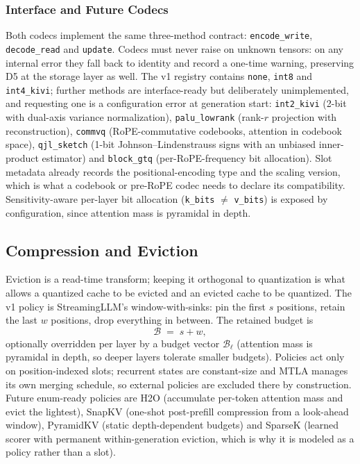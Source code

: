\subsubsection{Interface and Future Codecs}

Both codecs implement the same three-method contract: \texttt{encode\_write}, \texttt{decode\_read} and \texttt{update}. Codecs must never raise on unknown tensors: on any internal error they fall back to identity and record a one-time warning, preserving D5 at the storage layer as well. The v1 registry contains \texttt{none}, \texttt{int8} and \texttt{int4\_kivi}; further methods are interface-ready but deliberately unimplemented, and requesting one is a configuration error at generation start: \texttt{int2\_kivi} (2-bit with dual-axis variance normalization), \texttt{palu\_lowrank} (rank-$r$ projection with reconstruction), \texttt{commvq} (RoPE-commutative codebooks, attention in codebook space), \texttt{qjl\_sketch} (1-bit Johnson--Lindenstrauss signs with an unbiased inner-product estimator) and \texttt{block\_gtq} (per-RoPE-frequency bit allocation). Slot metadata already records the positional-encoding type and the scaling version, which is what a codebook or pre-RoPE codec needs to declare its compatibility. Sensitivity-aware per-layer bit allocation (\texttt{k\_bits} $\ne$ \texttt{v\_bits}) is exposed by configuration, since attention mass is pyramidal in depth.

\subsection{Compression and Eviction}
\label{sec:kv-evict}

Eviction is a read-time transform; keeping it orthogonal to quantization is what allows a quantized cache to be evicted and an evicted cache to be quantized. The v1 policy is StreamingLLM's window-with-sinks: pin the first $s$ positions, retain the last $w$ positions, drop everything in between. The retained budget is
\[
\mathcal{B} \;=\; s + w ,
\]
optionally overridden per layer by a budget vector $\mathcal{B}_\ell$ (attention mass is pyramidal in depth, so deeper layers tolerate smaller budgets). Policies act only on position-indexed slots; recurrent states are constant-size and MTLA manages its own merging schedule, so external policies are excluded there by construction. Future enum-ready policies are H2O (accumulate per-token attention mass and evict the lightest), SnapKV (one-shot post-prefill compression from a look-ahead window), PyramidKV (static depth-dependent budgets) and SparseK (learned scorer with permanent within-generation eviction, which is why it is modeled as a policy rather than a slot).

